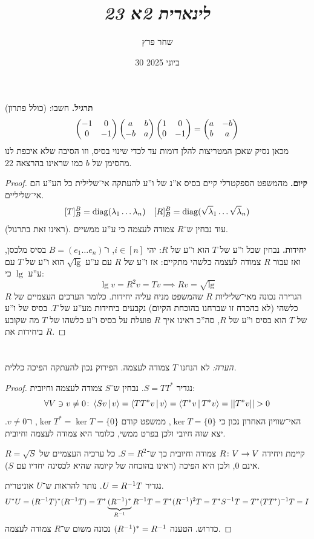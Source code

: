 \documentclass[]{../../../../tex/classes/styledArticle}
\author{שחר פרץ}
\title{\textit{לינארית 2א 23}}
\date{30 ביוני 2025}
\begin{document}
	\maketitle
	\textbf{תרגיל. }חשבו: (כולל פתרון)
	\[ \begin{pmatrix} -1 & 0 \\ 0 & -1 \end{pmatrix}\begin{pmatrix} a & b \\ -b & a \end{pmatrix}\begin{pmatrix} 1 & 0 \\ 0 & -1 \end{pmatrix} = \begin{pmatrix} a & -b \\ b & a \end{pmatrix} \]
	מכאן נסיק שאכן המטריצות להלן דומות עד לכדי שינוי בסיס, וזו הסיבה שלא איכפת לנו מהסימן של $b$ כמו שראינו בהרצאה 22. 
	
	
	\begin{proof}
		\textbf{קיום. }
		מהמשפט הספקטרלי קיים בסיס א''נ של ו''ע להעתקה אי־שלילית כל הע''ע הם אי־שליליים. 
		\[ [T]^{B}_B = \operatorname{diag}(\lambda_1 \dots \lambda_n) \quad [R]_B^B = \operatorname{diag}(\sqrt {\lambda}_1 \dots \sqrt {\lambda}_n) \]
		(ראינו זאת בתרגול). עוד נבחין ש־$R$ צמודה לעצמה כי ע''ע ממשיים. 
		
		\textbf{יחידות. }נבחין שכל ו''ע של $T$ הוא ו''ע של $R$: יהי $i \in [n]$, ו־$B = (e_1 \dots e_n)$ בסיס מלכסן, ואז עבור $R$ צמודה לעצמה כלשהי מתקיים: אז ו''ע של $R$ עם ע''ע $\sqrt \lg$ הוא ו''ע של $T$ עם ע''ע $\lg$ כי: 
		\[ \lg v = R^2v = Tv \implies Rv = \sqrt \lg \]
		הגרירה נכונה מאי־שליליות $R$ שהמשפט מניח עליה יחידות. כלומר הערכים העצמיים של $R$ כלשהי (לא בהכרח זו שברחנו בהוכחת הקיום) נקבעים ביחידות מע''ע של $T$. בסיס של ו''ע של $T$ הוא בסיס ו''ע של $R$, סה''כ ראינו איך $R$ פועלת על בסיס ו''ע כלשהו של $T$ מה שקובע ביחידות את $R$. 
	\end{proof}
	
	
	\section{}
	\textit{הערה: }לא הנחנו $T$ צמודה לעצמה. הפירוק נכון להעתקה הפיכה כללית. 
	\begin{proof}
		נגדיר $S = TT^*$. נבחין ש־$S$ צמודה לעצמה וחיובית: 
		\[ \forall V \ni v \neq 0 \colon \left \langle Sv \,\middle|\, v \right \rangle = \left \langle TT^* v \,\middle|\, v \right \rangle = \left \langle T^* v \,\middle|\, T^*v \right \rangle = \left \vert \left \vert T^*v \right \vert \right \vert > 0 \]
		האי־שוויון האחרון נכון כי $\ker T = \{0\}$, ממשפט קודם $\ker T^* = \ker T = \{0\}$, ו־$v \neq 0$. יצא שזה חיובי ולכן בפרט ממשי, כלומר היא צמודה לעצמה וחיובית. 
		
		קיימת ויחידה $R \colon V \to V$ צמודה וחיובית כך ש־$S = R^2$. כל ערכיה העצמיים של $R = \sqrt S$ אינם $0$, ולכן היא הפיכה (ראינו בהוכחה של קיומה שהיא לכסינה יחדיו עם $S$). 
		
		נגדיר $U = R^{-1} T$. נותר להראות ש־$U$ אוניטרית. 
		\[ U^*U = (R^{-1} T)^*(R^{-1} T) = T^*\underbrace{(R^{-1})^*}_{R^{-1}}R^{-1} T = T^*(R^{-1})^2 T = T^*S^{-1} T = T^*(TT^*)^{-1} T = I \]
		כדרוש. הטענה $(R^{-1})^* = R^{-1}$ נכונה משום ש־$R$ צמודה לעצמה. 
	\end{proof}
	
\end{document}
